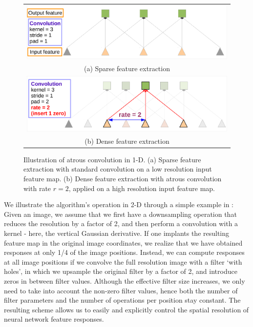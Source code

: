  \begin{figure}
  \begin{tabular}{c}
    \includegraphics[width=0.9\linewidth]{fig/atrous_fig1.pdf} \\
    {\scriptsize (a) Sparse feature extraction} \\
    \includegraphics[width=0.9\linewidth]{fig/atrous_fig2.pdf} \\
    {\scriptsize (b) Dense feature extraction} \\
  \end{tabular}
  \caption{Illustration of atrous convolution in 1-D. (a) Sparse feature
    extraction with standard convolution on a low resolution input feature map.
    (b) Dense feature extraction with atrous convolution with rate $r = 2$,
    applied on a high resolution input feature map.}
  \label{fig:hole}
\end{figure}

We illustrate the algorithm's operation in 2-D through a simple example in : Given an image, we 
assume that we first have a downsampling operation that reduces the resolution by a factor of 2, and then perform  a 
convolution with a  kernel - here, the vertical Gaussian derivative. If one  implants the resulting 
feature map in the original image coordinates, we realize that we have obtained responses at only 1/4 of the image positions. 
Instead, we can compute responses at all image positions 
if we convolve the full resolution image with a filter `with holes', in which 
we upsample the original filter by a
factor of 2, and introduce zeros  in between filter values. 
Although the effective filter size increases, we only need to take into account the
non-zero filter values, hence both the number of filter parameters and the number of operations per position stay constant. 
The resulting scheme allows us to easily and explicitly control the spatial resolution of neural
network feature responses.

